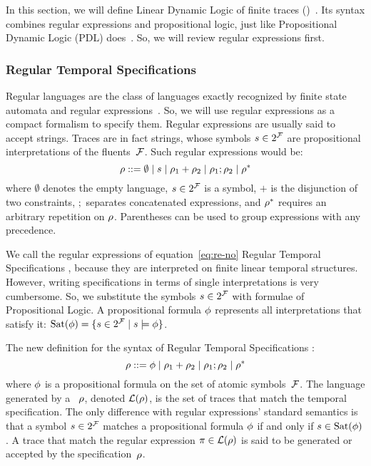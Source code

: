In this section, we will define Linear Dynamic Logic of finite traces
(\ldl{})~\cite{bib:ltlf-ldlf}. Its syntax combines regular expressions and
propositional logic, just like Propositional Dynamic Logic (PDL)
does~\cite{bib:pdl}\cite{bib:pdl-stanford}. So, we will review regular
expressions first.


\subsubsection{Regular Temporal Specifications}

Regular languages are the class of languages exactly recognized by finite
state automata and regular expressions~\cite{bib:languages-book}. So, we will
use regular expressions as a compact formalism to specify them. Regular
expressions are usually said to accept strings. Traces are in fact strings,
whose symbols $s \in 2^{\mathcal{F}}$ are propositional interpretations of the
fluents~$\mathcal{F}$. Such regular expressions would be:
\begin{equation}
	\rho ::= \emptyset \mid s \mid
	\rho_1 + \rho_2 \mid \rho_1 ; \rho_2 \mid \rho^*
	\label{eq:re-no}
\end{equation}
where $\emptyset$ denotes the empty language, $s \in 2^{\mathcal{F}}$ is a symbol,
$+$ is the disjunction of two constraints, $;$ separates concatenated
expressions, and $\rho^*$ requires an arbitrary repetition on $\rho$.
Parentheses can be used to group expressions with any precedence.

We call the regular expressions of equation~\eqref{eq:re-no} Regular Temporal
Specifications \re{}, because they are interpreted on finite linear temporal
structures. However, writing specifications in terms of single interpretations
is very cumbersome. So, we substitute the symbols $s \in 2^{\mathcal{F}}$ with
formulae of Propositional Logic. A propositional formula $\phi$
represents all interpretations that satisfy it: $\text{Sat}(\phi) = \{s
\in 2^{\mathcal{F}} \mid s \models \phi\}$.

The new definition for the syntax of Regular Temporal Specifications \re{}:
\begin{equation}
	\rho ::= \phi \mid
	\rho_1 + \rho_2 \mid \rho_1 ; \rho_2 \mid \rho^*
	\label{eq:re}
\end{equation}
where $\phi$ is a propositional formula on the set of atomic
symbols~$\mathcal{F}$. The language generated by a \re{}~$\rho$, denoted
$\mathcal{L}(\rho)$, is the set of traces that match the temporal
specification. The only difference with regular expressions' standard
semantics is that a symbol $s \in 2^{\mathcal{F}}$ matches a propositional formula
$\phi$ if and only if $s \in \text{Sat}(\phi)$. A trace that
match the regular expression $\pi \in \mathcal{L}(\rho)$ is said to be
generated or accepted by the specification~$\rho$.

